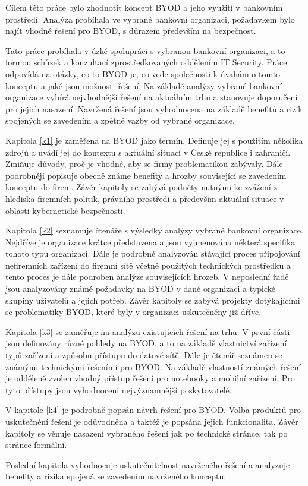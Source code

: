 Cílem této práce bylo zhodnotit koncept BYOD a jeho využití v bankovním prostředí. Analýza probíhala ve vybrané bankovní organizaci, požadavkem bylo najít vhodné řešení pro BYOD, s důrazem především na bezpečnost.

Tato práce probíhala v úzké spolupráci s vybranou bankovní organizaci, a to formou schůzek a konzultací zprostředkovaných oddělením IT Security. Práce odpovídá na otázky, co to BYOD je, co vede společnosti k úvahám o tomto konceptu a jaké jsou možnosti řešení.  Na základě analýzy vybrané bankovní organizace vybírá nejvhodnější řešení na aktuálním trhu a stanovuje doporučení pro jejich nasazení. Navržená řešení jsou vyhodnocena na základě benefitů a rizik spojených se zavedením a zpětné vazby od vybrané organizace.


Kapitola \ref{k1} je zaměřena na BYOD jako termín. Definuje jej s použitím několika zdrojů a uvádí jej do kontextu s aktuální situací v České republice i zahraničí. Zmiňuje důvody, proč je vhodné, aby se firmy problematikou zabývaly. Dále podrobněji popisuje obecně známe benefity a hrozby související se zavedením konceptu do firem. Závěr kapitoly se zabývá podněty nutnými ke zvážení z hlediska firemních politik, právního prostředí a především aktuální situace v oblasti kybernetické bezpečnosti.  



Kapitola \ref{k2} seznamuje čtenáře s výsledky analýzy vybrané bankovní organizace. Nejdříve je organizace krátce představena a jsou vyjmenována některá specifika tohoto typu organizací. Dále je podrobně analyzován stávající proces připojování nefiremních zařízení do firemní sítě včetně použitých technických prostředků a tento proces je dále podroben analýze souvisejících hrozeb. V neposlední řadě jsou analyzovány známé požadavky na BYOD v dané organizaci a typické skupiny uživatelů a jejich potřeb. Závěr kapitoly se zabývá projekty dotýkajícími se problematiky BYOD, které byly v organizaci uskutečněny již dříve.

Kapitola \ref{k3} se zaměřuje na analýzu existujících řešení na trhu. V první části jsou definovány různé pohledy na BYOD, a to na základě vlastnictví zařízení, typů zařízení a způsobu přístupu do datové sítě. Dále je čtenář seznámen se známými technickými řešeními pro BYOD. Na základě vlastností známých řešení je odděleně zvolen vhodný přístup řešení pro notebooky a mobilní zařízení. Pro tyto přístupy jsou vyhodnoceni nejvýznamnější poskytovatelé. 


V kapitole \ref{k4} je podrobně popsán návrh řešení pro BYOD. Volba produktů pro uskutečnění řešení je odůvodněna a taktéž je popsána jejich funkcionalita. Závěr kapitoly se věnuje nasazení vybraného řešení jak po technické stránce, tak po stránce formální. 

Poslední kapitola vyhodnocuje uskutečnitelnost navrženého řešení a analyzuje benefity a rizika spojená se zavedením navrženého konceptu.